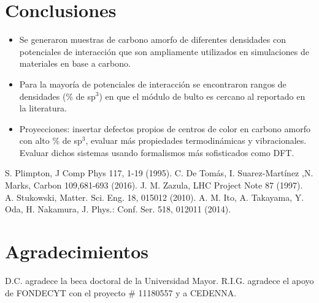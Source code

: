 \documentclass[a0]{sciposter}
\begin{document}
\begin{multicols}{2}
\section{Conclusiones}
\begin{itemize}
    \item  Se generaron muestras de carbono amorfo de diferentes densidades con potenciales de interacci\'on que son ampliamente utilizados en simulaciones de materiales en base a carbono. \\
    \item  Para la mayor\'ia de potenciales de interacci\'on se encontraron rangos de densidades  (\% de sp$^3$) en que el m\'odulo de bulto es cercano al reportado en la literatura.\\
 
 
    \item Proyecciones: insertar defectos propios de centros de color en carbono amorfo con alto \% de sp$^3$, evaluar más propiedades termodinámicas y vibracionales. Evaluar dichos sistemas usando formalismos más sofisticados como DFT.\\ 
\end{itemize}

\begin{thebibliography}{99}
 S. Plimpton, J Comp Phys 117, 1-19 (1995).
 C. De Tomás, I. Suarez-Martínez ,N. Marks, Carbon 109,681-693 (2016).
 J. M. Zazula, LHC Project Note 87 (1997).
 A. Stukowski, Matter. Sci. Eng. 18, 015012 (2010).
 A. M. Ito, A. Takayama, Y. Oda, H. Nakamura, J. Phys.: Conf. Ser. 518, 012011 (2014).
\end{thebibliography}

\section{Agradecimientos}
D.C. agradece la beca doctoral de la Universidad Mayor. R.I.G. agradece el apoyo de FONDECYT con el proyecto \# 11180557 y a CEDENNA.

\end{multicols}
\end{document}
